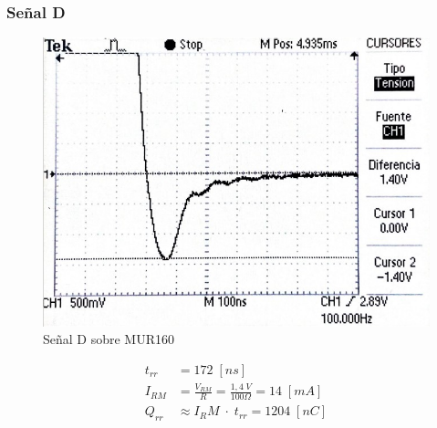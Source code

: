 \documentclass{article}
\begin{document}
\subsubsection{Señal D}
\begin{figure}[h!]
 \begin{center}
	\includegraphics[scale=0.5]{imagenes/MUR_D.jpg} 
	\caption{Señal D sobre MUR160}
 \end{center}
\end{figure}
%
\begin{align*}
	t_{rr} &= 172 \; [ns] \\
	I_{RM}	&= \frac{V_{RM}}{R} = \frac{1,4 \; V}{100 \Omega} = 14 \; [mA] \\
	Q_{rr}	&\approx {I_RM} \; \cdot \; t_{rr} = 1204 \; [nC]
\end{align*}
%
\end{document}
